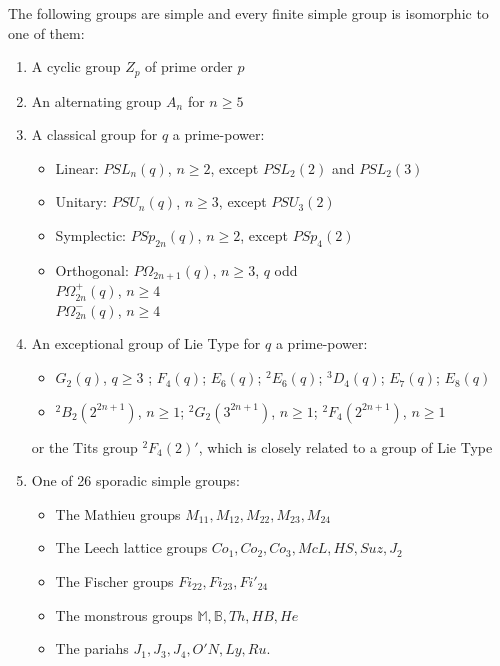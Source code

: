 \documentclass[a4paper]{article}
\begin{document}
\begin{theorem}
The following groups are simple and every finite simple group is isomorphic to one of them:
\begin{enumerate}
	\item
	A cyclic group $Z_p$ of prime order $p$
	\item
	An alternating group $A_n$ for $n \ge 5$
	\item
	A classical group for $q$ a prime-power:
	\begin{itemize}
		\item
		Linear: $PSL_n(q)$, $n \ge 2$, except $PSL_2(2)$ and $PSL_2(3)$
		\item
		Unitary: $PSU_n(q)$, $n \ge 3$, except $PSU_3(2)$
		\item
		Symplectic: $PSp_{2n}(q)$, $n \ge 2$, except $PSp_4(2)$
		\item
		Orthogonal: $P\Omega_{2n+1}(q)$, $n \ge 3$, $q$ odd\\
		$P\Omega^+_{2n}(q)$, $n \ge 4$\\
		$P\Omega^-_{2n}(q)$, $n \ge 4$
	\end{itemize}
	\item
	An exceptional group of Lie Type for $q$ a prime-power:
	\begin{itemize}
		\item $G_2(q)$, $q \ge 3$ ;
		$F_4(q)$;
		$E_6(q)$;
		${}^2E_6(q)$;
		${}^3D_4(q)$;
		$E_7(q)$;
		$E_8(q)$
		\item
		${}^2B_2(2^{2n+1})$, $n \ge 1$;
		${}^2G_2(3^{2n+1})$, $n \ge 1$;
		${}^2F_4(2^{2n+1})$, $n \ge 1$
	\end{itemize}
	or the Tits group ${}^2F_4(2)'$, which is closely related to a group of Lie Type
	\item
	One of 26 sporadic simple groups:
	\begin{itemize}
		\item
		The Mathieu groups $M_{11}, M_{12}, M_{22}, M_{23}, M_{24}$
		\item
		The Leech lattice groups $Co_1, Co_2, Co_3, McL, HS, Suz, J_2$
		\item
		The Fischer groups $Fi_{22}, Fi_{23}, Fi'_{24}$
		\item
		The monstrous groups $\mathbb{M}, \mathbb{B}, Th, HB, He$
		\item
		The pariahs $J_1, J_3, J_4, O'N, Ly, Ru$.
	\end{itemize}
\end{enumerate}
\end{theorem}
\end{document}
